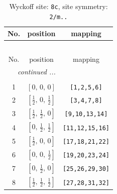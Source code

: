 \documentclass[fleqn,8pt]{jsarticle}
\begin{document}
\begin{longtable}{ccc}
\caption{Wyckoff site: {\tt 8c}, site symmetry: {\tt 2/m..}}
 \\
 \hline \hline
No. & position & mapping \\ \hline \endfirsthead

\multicolumn{2}{l}{\tablename\ \thetable{}} \\
 \hline \hline
No. & position & mapping \\ \hline \endhead

 \hline \hline
\multicolumn{2}{r}{\footnotesize\it continued ...} \\ \endfoot

 \hline \hline
\multicolumn{2}{r}{} \\ \endlastfoot

1 & $\left[ 0,\, 0,\, 0 \right]$ & {\tt [1,2,5,6]} \\ \hline
2 & $\left[ \frac{1}{2},\, 0,\, \frac{1}{2} \right]$ & {\tt [3,4,7,8]} \\ \hline
3 & $\left[ \frac{1}{2},\, \frac{1}{2},\, 0 \right]$ & {\tt [9,10,13,14]} \\ \hline
4 & $\left[ 0,\, \frac{1}{2},\, \frac{1}{2} \right]$ & {\tt [11,12,15,16]} \\ \hline
5 & $\left[ \frac{1}{2},\, 0,\, 0 \right]$ & {\tt [17,18,21,22]} \\ \hline
6 & $\left[ 0,\, 0,\, \frac{1}{2} \right]$ & {\tt [19,20,23,24]} \\ \hline
7 & $\left[ 0,\, \frac{1}{2},\, 0 \right]$ & {\tt [25,26,29,30]} \\ \hline
8 & $\left[ \frac{1}{2},\, \frac{1}{2},\, \frac{1}{2} \right]$ & {\tt [27,28,31,32]} \\
\end{longtable}
\renewcommand{\arraystretch}{1.2}
\end{document}
